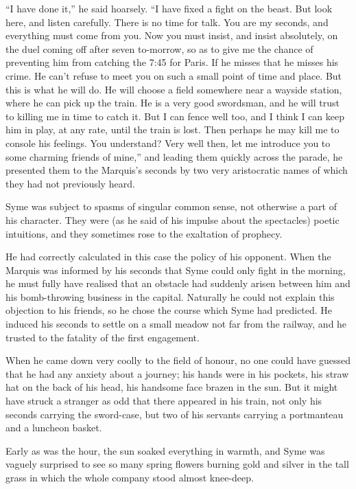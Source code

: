 \documentclass{book}
\begin{document}
“I have done it,” he said hoarsely. “I have fixed a fight on the beast. But look here, and listen carefully. There is no time for talk. You are my seconds, and everything must come from you. Now you must insist, and insist absolutely, on the duel coming off after seven to-morrow, so as to give me the chance of preventing him from catching the 7:45 for Paris. If he misses that he misses his crime. He can’t refuse to meet you on such a small point of time and place. But this is what he will do. He will choose a field somewhere near a wayside station, where he can pick up the train. He is a very good swordsman, and he will trust to killing me in time to catch it. But I can fence well too, and I think I can keep him in play, at any rate, until the train is lost. Then perhaps he may kill me to console his feelings. You understand? Very well then, let me introduce you to some charming friends of mine,” and leading them quickly across the parade, he presented them to the Marquis’s seconds by two very aristocratic names of which they had not previously heard.

Syme was subject to spasms of singular common sense, not otherwise a part of his character. They were (as he said of his impulse about the spectacles) poetic intuitions, and they sometimes rose to the exaltation of prophecy.

He had correctly calculated in this case the policy of his opponent. When the Marquis was informed by his seconds that Syme could only fight in the morning, he must fully have realised that an obstacle had suddenly arisen between him and his bomb-throwing business in the capital. Naturally he could not explain this objection to his friends, so he chose the course which Syme had predicted. He induced his seconds to settle on a small meadow not far from the railway, and he trusted to the fatality of the first engagement.

When he came down very coolly to the field of honour, no one could have guessed that he had any anxiety about a journey; his hands were in his pockets, his straw hat on the back of his head, his handsome face brazen in the sun. But it might have struck a stranger as odd that there appeared in his train, not only his seconds carrying the sword-case, but two of his servants carrying a portmanteau and a luncheon basket.

Early as was the hour, the sun soaked everything in warmth, and Syme was vaguely surprised to see so many spring flowers burning gold and silver in the tall grass in which the whole company stood almost knee-deep.
\end{document}
